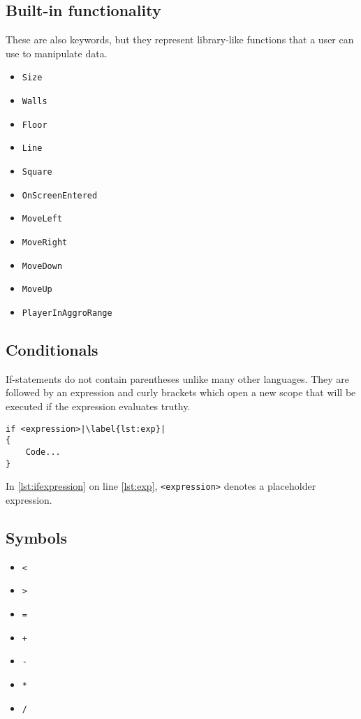 \subsection{Built-in functionality}
These are also keywords, but they represent library-like functions that a user can use to manipulate data.
\begin{multicols}{3}
    \begin{itemize}
        \item \texttt{Size}
        \item \texttt{Walls}
        \item \texttt{Floor}
        \item \texttt{Line}
        \item \texttt{Square}
        \item \texttt{OnScreenEntered}
        \item \texttt{MoveLeft}
        \item \texttt{MoveRight}
        \item \texttt{MoveDown}
        \item \texttt{MoveUp}
        \item \texttt{PlayerInAggroRange}
    \end{itemize}
\end{multicols}

\subsection{Conditionals}
If-statements do not contain parentheses unlike many other languages. They are followed by an expression and curly brackets which open a new scope that will be executed if the expression evaluates truthy.

\begin{lstlisting}[caption={Example of an if statement}, label={lst:ifexpression},escapechar=|]
if <expression>|\label{lst:exp}|
{
    Code...
}
\end{lstlisting}

In \ref{lst:ifexpression} on line \ref{lst:exp},  \verb|<expression>| denotes a placeholder expression.

\subsection{Symbols}
\begin{itemize}
    \item \verb|<|
    \item \verb|>|
    \item \verb|=|
    \item \verb|+|
    \item \verb|-|
    \item \verb|*|
    \item \verb|/|
\end{itemize}

